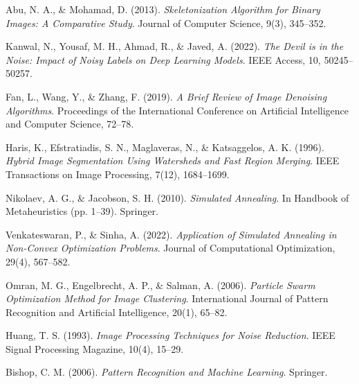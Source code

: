\documentclass[conference]{IEEEtran}
\begin{document}
\begin{thebibliography}{99}

Abu, N. A., \& Mohamad, D. (2013). \textit{Skeletonization Algorithm for Binary Images: A Comparative Study}. Journal of Computer Science, 9(3), 345–352.

Kanwal, N., Yousaf, M. H., Ahmad, R., \& Javed, A. (2022). \textit{The Devil is in the Noise: Impact of Noisy Labels on Deep Learning Models}. IEEE Access, 10, 50245–50257.

Fan, L., Wang, Y., \& Zhang, F. (2019). \textit{A Brief Review of Image Denoising Algorithms}. Proceedings of the International Conference on Artificial Intelligence and Computer Science, 72–78.

Haris, K., Efstratiadis, S. N., Maglaveras, N., \& Katsaggelos, A. K. (1996). \textit{Hybrid Image Segmentation Using Watersheds and Fast Region Merging}. IEEE Transactions on Image Processing, 7(12), 1684–1699.

Nikolaev, A. G., \& Jacobson, S. H. (2010). \textit{Simulated Annealing}. In Handbook of Metaheuristics (pp. 1–39). Springer.

Venkateswaran, P., \& Sinha, A. (2022). \textit{Application of Simulated Annealing in Non-Convex Optimization Problems}. Journal of Computational Optimization, 29(4), 567–582.

Omran, M. G., Engelbrecht, A. P., \& Salman, A. (2006). \textit{Particle Swarm Optimization Method for Image Clustering}. International Journal of Pattern Recognition and Artificial Intelligence, 20(1), 65–82.

Huang, T. S. (1993). \textit{Image Processing Techniques for Noise Reduction}. IEEE Signal Processing Magazine, 10(4), 15–29.

Bishop, C. M. (2006). \textit{Pattern Recognition and Machine Learning}. Springer.


\end{thebibliography}
\end{document}
